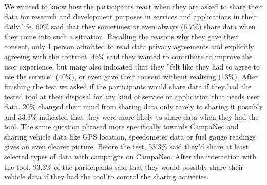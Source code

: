 \documentclass[../paper.tex]{subfiles}
\begin{document}
  We wanted to know how the participants react when they are asked to share their data for research and development purposes in services and applications in their daily life.
  60\% said that they sometimes or even always (6.7\%) share data when they come into such a situation.
  Recalling the reasons why they gave their consent, only 1 person admitted to read data privacy agreements and explicitly agreeing with the contract.
  46\% said they wanted to contribute to improve the user experience, but many also indicated that they ''felt like they had to agree to use the service`` (40\%), or even gave their consent without realising (13\%).
  After finishing the test we asked if the participants would share data if they had the tested tool at their disposal for any kind of service or application that needs user data.
  20\% changed their mind from sharing data only rarely to sharing it possibly and 33.3\% indicated that they were more likely to share data when they had the tool.
  The same question phrased more specifically towards CampaNeo and sharing vehicle data like GPS location, speedometer data or fuel gauge readings gives an even clearer picture.
  Before the test, 53.3\% said they'd share at least selected types of data with campaigns on CampaNeo. After the interaction with the tool, 93.3\% of the participants said that they would possibly share their vehicle data if they had the tool to control the sharing activities. 
\end{document}
